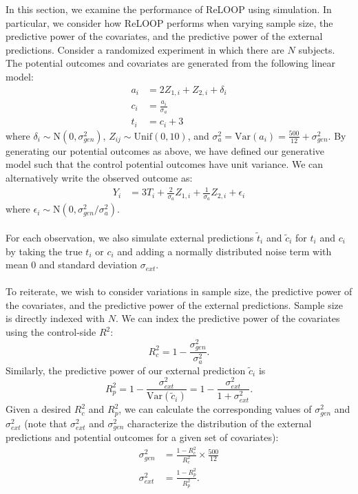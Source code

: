 

In this section, we examine the performance of ReLOOP using simulation. In particular, we consider how ReLOOP performs when varying sample size, the predictive power of the covariates, and the predictive power of the external predictions. Consider a randomized experiment in which there are $N$ subjects. The potential outcomes and covariates are generated from the following linear model:
\begin{align*}
a_i &= 2Z_{1,i} + Z_{2,i} + \delta_i \\
c_i &= \frac{ a_i }{ \sigma_{a} } \\
t_i &= c_i + 3
\end{align*}
where $\delta_i \sim \text{N}(0,\sigma_{gen}^2)$, $Z_{ij} \sim \text{Unif}(0,10)$, and $\sigma^2_{a} = \text{Var}(a_i) = \frac{500}{12} + \sigma_{gen}^2$. By generating our potential outcomes as above, we have defined our generative model such that the control potential outcomes have unit variance. We can alternatively write the observed outcome as:
\begin{align*}
Y_i &= 3 T_i + \frac{2}{\sigma_{a}}Z_{1,i} + \frac{1}{\sigma_{a}} Z_{2,i} + \epsilon_i
\end{align*}
where $\epsilon_i \sim \text{N}(0,\sigma_{gen}^2/\sigma^2_{a})$.
\\\\
For each observation, we also simulate external predictions $\tilde{t}_i$ and $\tilde{c}_i$ for $t_i$ and $c_i$ by taking the true $t_i$ or $c_i$ and adding a normally distributed noise term with mean 0 and standard deviation $\sigma_{ext}$.
\\\\
To reiterate, we wish to consider variations in sample size, the predictive power of the covariates, and the predictive power of the external predictions. Sample size is directly indexed with $N$. We can index the predictive power of the covariates using the control-side $R^2$:
\[ R_c^2 = 1 - \frac{ \sigma^2_{gen} }{ \sigma^2_{a} }. \]
Similarly, the predictive power of our external prediction $\tilde{c}_i$ is
\[ R^2_{p} = 1 - \frac{\sigma_{ext}^2}{\text{Var}( \tilde{c}_i )} = 1 - \frac{\sigma^2_{ext}}{1+\sigma^2_{ext}}. \]
Given a desired $R_c^2$ and $R^2_{p}$, we can calculate the corresponding values of $\sigma^2_{gen}$ and $\sigma^2_{ext}$ (note that $\sigma_{ext}^2$ and $\sigma_{gen}^2$ characterize the distribution of the external predictions and potential outcomes for a given set of covariates):
\begin{align*}
\sigma^2_{gen} &= \frac{1-R_c^2}{R_c^2}\times\frac{500}{12} \\
\sigma^2_{ext} &= \frac{1 - R^2_{p}}{R_p^2} .
\end{align*}
